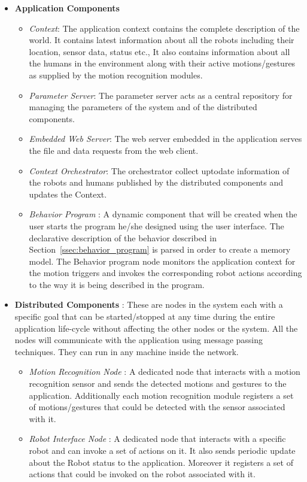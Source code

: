 \documentclass{llncs}
\begin{document}
\begin{itemize}
\item \textbf{Application Components}
\begin{itemize}
\item \emph{Context}: The application context contains the complete description of the world. It contains latest information about all the robots including their location, sensor data, status etc., It also contains information about all the humans in the environment along with their active motions/gestures as supplied by the motion recognition modules.
\item \emph{Parameter Server}: The parameter server acts as a central repository for managing the parameters of the system and of the distributed components.
\item \emph{Embedded Web Server}: The web server embedded in the application serves the file and data requests from the web client.
\item \emph{Context Orchestrator}: The orchestrator collect uptodate information of the robots and humans published by the distributed components and updates the Context.
\item \emph{Behavior Program} : A dynamic component that will be created when the user starts the program he/she designed using the user interface. The declarative description of the behavior described in Section~\ref{ssec:behavior_program} is parsed in order to create a memory model. The Behavior program node monitors the application context for the motion triggers and invokes the corresponding robot actions according to the way it is being described in the program.
\end{itemize}
\item \textbf{Distributed Components} : These are nodes in the system each with a specific goal that can be started/stopped at any time during the entire application life-cycle without affecting the other nodes or the system. All the nodes will communicate with the application using message passing techniques. They can run in any machine inside the network.
\begin{itemize}
\item \emph{Motion Recognition Node} : A dedicated node that interacts with a motion recognition sensor and sends the detected motions and gestures to the application. Additionally each motion recognition module registers a set of motions/gestures that could be detected with the sensor associated with it.
\item \emph{Robot Interface Node} : A dedicated node that interacts with a specific robot and can invoke a set of actions on it. It also sends periodic update about the Robot status to the application. Moreover it registers a set of actions that could be invoked on the robot associated with it.

\end{itemize}
\end{itemize}
\end{document}
